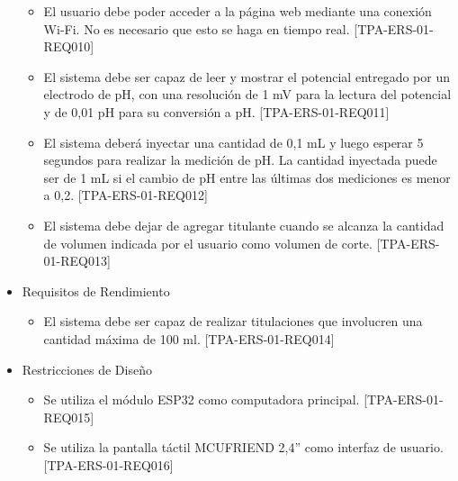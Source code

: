 \begin{itemize}
\begin{itemize}
	\item El usuario debe poder acceder a la página web mediante una conexión Wi-Fi. No es necesario que esto se haga en tiempo real. [TPA-ERS-01-REQ010]
	\item El sistema debe ser capaz de leer y mostrar el potencial entregado por un electrodo de pH, con una resolución de 1 mV para la lectura del potencial y de 0,01 pH para su conversión a pH. [TPA-ERS-01-REQ011]
	\item El sistema deberá inyectar una cantidad de 0,1 mL y luego esperar 5 segundos para realizar la medición de pH. La cantidad inyectada puede ser de 1 mL si el cambio de pH entre las últimas dos mediciones es menor a 0,2. [TPA-ERS-01-REQ012]
	 \item El sistema debe dejar de agregar titulante cuando se alcanza la cantidad de volumen indicada por el usuario como volumen de corte. [TPA-ERS-01-REQ013]

\end{itemize}

\item Requisitos de Rendimiento
	\begin{itemize}
	\item El sistema debe ser capaz de realizar titulaciones que involucren una cantidad máxima de 100 ml. [TPA-ERS-01-REQ014]
	\end{itemize}
	
\item Restricciones de Diseño
	\begin{itemize}
	\item Se utiliza el módulo ESP32 como computadora principal. [TPA-ERS-01-REQ015]
	\item Se utiliza la pantalla táctil MCUFRIEND 2,4'' como interfaz de usuario. [TPA-ERS-01-REQ016]
	\end{itemize}
\end{itemize}	

